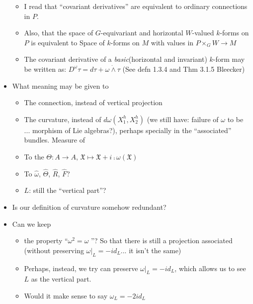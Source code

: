 \begin{itemize}
\begin{itemize}
        \item I read that ``covariant derivatives'' are equivalent to ordinary connections in $P$.
        
        \item Also, that the space of $G$-equivariant and horizontal $W$-valued $k$-forms on $P$ is equivalent to Space of $k$-forms on $M$ with values in $P\times_G W \to M$
        
        \item The covariant derivative of a \emph{basic}(horizontal and invariant) $k$-form may be written as: $D^\omega \tau = d\tau + \omega \dot{\wedge} \tau$ (See defn 1.3.4 and Thm 3.1.5 Bleecker) 
    \end{itemize}
    
    
    
    \item What meaning may be given to \label{whatMeaning}
    \begin{itemize}
        \item The connection, instead of vertical projection
        
        \item The curvature, instead of $d\omega(X_1^h, X_2^h)$ (we still have: failure of $\omega$ to be ... morphism of Lie algebras?), perhaps specially in the ``associated'' bundles. Measure of 
        
        \item To the $\Theta:A \to A$, $\mathfrak X \mapsto \mathfrak X + i \comp \omega(\mathfrak X)$ 
        
        \item To $\hat \omega$, $\hat \Theta$, $\hat R$, $\hat F$?
        
        \item $L$: still the ``vertical part''?
    \end{itemize}
    
    \item Is our definition of curvature somehow redundant? \label{curvatureRedundant}
    
    \item Can we keep \label{canKeep}
    \begin{itemize}
        \item the property ``$\omega^2 = \omega$ ''? So that there is still a projection associated (without preserving $\omega |_L = -id_L$... it isn't the same)
        
        \item Perhaps, instead, we try can preserve $\omega |_L = -id_L$, which allows us to see $L$ as the vertical part.
        
        \item Would it make sense to say $\omega_L = -2id_L$
    \end{itemize}
\end{itemize}

